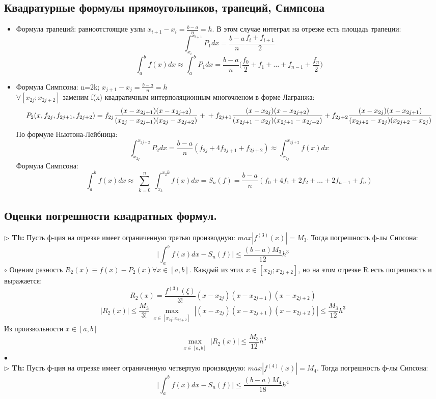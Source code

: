 \documentclass[a4paper]{article}
\begin{document}
\subsection{Квадратурные формулы прямоугольников, трапеций, Симпсона}
\begin{itemize}
	\item Формула трапеций: равноотстоящие узлы $x_{i+1}-x_i=\frac{b-a}{n}=h$. В этом случае интеграл на отрезке есть площадь трапеции:
	$$ \int_{x_i}^{x_{i+1}} P_1dx = \frac{b-a}{n} \frac{f_i+f_{i+1}}{2}$$
	$$ \int_{a}^b f(x)dx \approx \int_{a}^b P_1 dx  = \frac{b-a}{n} \big(\frac{f_0}{2} + f_1 + \ldots + f_{n-1} + \frac{f_n}{2} \big)$$
	\item Формула Симпсона: n=2k; $x_{j+1}-x_j=\frac{b-a}{n}=h$ \\
	$\forall [x_{2j};x_{2j+2}]$ заменим f(x) квадратичным интерполяционным многочленом в форме Лагранжа:
	$$ P_2(x,f_{2j},f_{2j+1},f_{2j+2}) = f_{2j} \frac{(x-x_{2j+1})(x-x_{2j+2})}{(x_{2j}-x_{2j+1})(x_{2j}-x_{2j+2})} + \\ + f_{2j+1} \frac{(x-x_{2j})(x-x_{2j+2})}{(x_{2j+1}-x_{2j})(x_{2j+1}-x_{2j+2})} + f_{2j+2} \frac{(x-x_{2j})(x-x_{2j+1})}{(x_{2j+2}-x_{2j})(x_{2j+2}-x_{2j})}$$
	По формуле Ньютона-Лейбница: $$\int_{x_{2j}}^{x_{2j+2}} P_2 dx = \frac{b-a}{n} (f_{2j} + 4f_{2j+1} + f_{2j+2}) \approx  \int_{x_{2j}}^{x_{2j+2}} f(x) dx$$
	Формула Симпсона:
	$$ \int_{a}^b f(x) dx \approx \sum_{\substack{k=0}}^n \int_{x_k}^{x_2k} f(x)dx = S_n(f) = \frac{b-a}{n} (f_0 + 4f_1 + 2f_2 + \ldots + 2f_{n-1} + f_n) $$
\end{itemize}
\subsection{Оценки погрешности квадратных формул.}
$\triangleright$ \textbf{Th:} Пусть ф-ция на отрезке имеет ограниченную третью производную: $ max |f^{(3)}(x)| = M_3$. Тогда погрешность ф-лы Сипсона:
$$ \big|\int_{a}^b f(x)dx - S_n(f) \big| \leq \frac{(b-a)M_3}{12}h^3$$
	$\circ$ 
		Оценим разность $R_2(x) \equiv f(x) - P_2(x) \forall x \in [a,b]$. Каждый из этих $x \in [x_{2j};x_{2j+2}]$, но на этом отрезке R есть погрешность и выражается: 
		$$ R_2(x) = \frac{f^{(3)}(\xi)}{3!} (x-x_{2j})(x-x_{2j+1})(x-x_{2j+2})$$
		$$ |R_2(x)| \leq  \frac{M_3}{3!} \max_{\substack{x \in [x_{2j};x_{2j+2}]}} |(x-x_{2j})(x-x_{2j+1})(x-x_{2j+2})| \leq \frac{M_3}{12}h^3$$
		Из произвольности $x \in [a,b]$
		$$ \max_{\substack{x \in [a,b]}} |R_2(x)| \leq \frac{M_3}{12}h^3$$
	$\bullet$ \\
$\triangleright$ \textbf{Th:} Пусть ф-ция на отрезке имеет ограниченную четвертую производную: $ max |f^{(4)}(x)| = M_4$. Тогда погрешность ф-лы Сипсона:
$$ \big|\int_{a}^b f(x)dx - S_n(f) \big| \leq \frac{(b-a)M_4}{18}h^4$$
\end{document}
